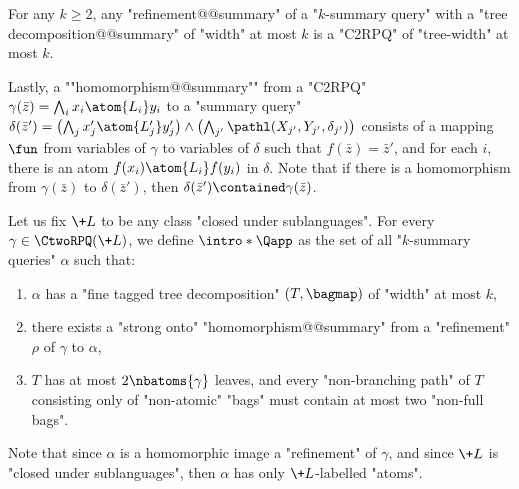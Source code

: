 \begin{fact}
	\AP\label{fact:tree-width-summary}
	For any $k\geq 2$, any "refinement@@summary" of a "$k$-summary query" with
	a "tree decomposition@@summary" of "width" at most $k$ is a "C2RPQ" of "tree-width" at most $k$.
\end{fact}

Lastly, a \AP""homomorphism@@summary"" from a "C2RPQ"
$\gamma(\bar z) = \bigwedge_{i} x_i \atom{L_i} y_i$
to a "summary query" $\delta(\bar z') =
\bigl( \bigwedge_{j} x'_j \atom{L'_j} y'_j \bigr)
\wedge \bigl( \bigwedge_{j'} \pathl(X_{j'}, Y_{j'}, \delta_{j'}) \bigr)$
consists of a mapping $\fun$ from variables of $\gamma$ to variables of $\delta$
such that $f(\bar z) = \bar z'$, and for each $i$,
there is an atom $f(x_i) \atom{L_i} f(y_i)$ in $\delta$.
Note that if there is a homomorphism from $\gamma(\bar z)$ to $\delta(\bar z')$,
then $\delta(\bar z') \contained \gamma(\bar z)$.

Let us fix $\+L$ to be any class  "closed under sublanguages". For every $\gamma \in \CtwoRPQ(\+L)$, we define \AP $\intro*\Qapp$ as the set of all "$k$-summary queries" $\alpha$ such that:
\begin{enumerate}[label=\roman*.]
	\item $\alpha$ has a "fine tagged tree decomposition" $(T, \bagmap)$ of "width" at most $k$,
	\item there exists a "strong onto" "homomorphism@@summary" from a "refinement" $\rho$ of $\gamma$ to $\alpha$, 
	\item $T$ has at most $2\nbatoms{\gamma}$ leaves, and every
		"non-branching path" of $T$ consisting only of "non-atomic" "bags" must contain at most two "non-full bags".
\end{enumerate}
Note that since $\alpha$ is a homomorphic image a "refinement" of $\gamma$,
and since $\+L$ is "closed under sublanguages", then $\alpha$ has only $\+L$-labelled "atoms".

